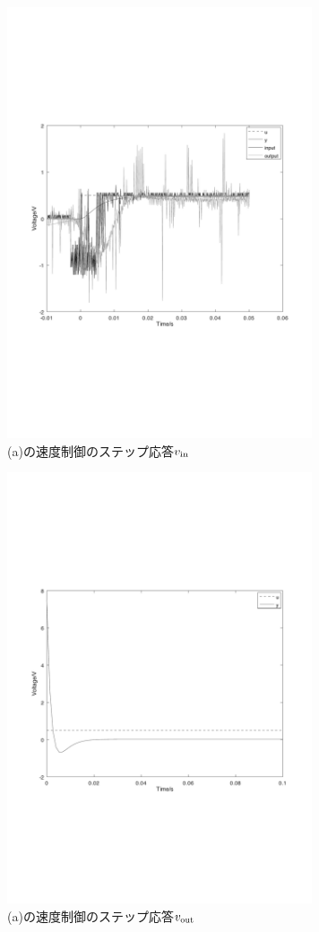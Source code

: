 \documentclass[uplatex, 11pt,a4j, titlepage]{jsarticle}
\begin{document}
\begin{figure}[h]
    \centering
    \includegraphics[width=9cm]{unitvain.pdf}
    \caption{(a)の速度制御のステップ応答$v_{\rm in}$}
    \label{unitvain}
\end{figure}

\begin{figure}[h]
    \centering
    \includegraphics[width=9cm]{unitvaout.pdf}
    \caption{(a)の速度制御のステップ応答$v_{\rm out}$}
    \label{unitvaout}
\end{figure}
\end{document}

